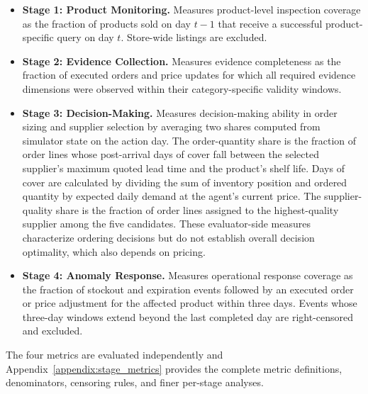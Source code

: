 \begin{itemize}[leftmargin=*]

    \item \textbf{Stage 1: Product Monitoring.}
    Measures product-level inspection coverage as the fraction of products sold on day $t-1$ that receive a successful product-specific query on day $t$. Store-wide listings are excluded.

    \item \textbf{Stage 2: Evidence Collection.}
    Measures evidence completeness as the fraction of executed orders and price updates for which all required evidence dimensions were observed within their category-specific validity windows.

    \item \textbf{Stage 3: Decision-Making.}
    Measures decision-making ability in order sizing and supplier selection by averaging two shares computed from simulator state on the action day. The order-quantity share is the fraction of order lines whose post-arrival days of cover fall between the selected supplier’s maximum quoted lead time and the product’s shelf life. Days of cover are calculated by dividing the sum of inventory position and ordered quantity by expected daily demand at the agent’s current price. The supplier-quality share is the fraction of order lines assigned to the highest-quality supplier among the five candidates. These evaluator-side measures characterize ordering decisions but do not establish overall decision optimality, which also depends on pricing.
 
    
    \item \textbf{Stage 4: Anomaly Response.}
    Measures operational response coverage as the fraction of stockout and expiration events followed by an executed order or price adjustment for the affected product within three days. Events whose three-day windows extend beyond the last completed day are right-censored and excluded.

\end{itemize}

The four metrics are evaluated independently and Appendix~\ref{appendix:stage_metrics} provides the complete metric definitions, denominators, censoring rules, and finer per-stage analyses.